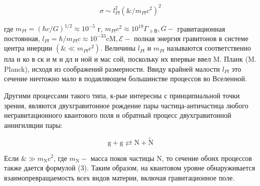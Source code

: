 \documentclass[10pt]{article}
\begin{document}
\[

\sigma \sim l_{P l}^{2}\left(\& / m_{P l} c^{2}\right)^{2}

\]



где $m_{P l}=(\hbar c / G)^{1 / 2} \approx 10^{-5}$ г, $m_{P l} c^{2} \approx 10^{19} \Gamma_{\ni В}, G-$ гравитационная постоянная, $l_{P l}=\hbar / m_{P l} c \approx 10^{-33} \mathrm{cM}, \mathscr{E}-$ полная энергия гравитонов в системе центра инерции $\left(\mathscr{\&} \ll m_{P l} c^{2}\right)$. Величины $l_{P l}$ и $m_{P l}$ называются соответственно пла н ко в ск и м и дл и ной и мас сой, поскольку их впервые ввел M. Планк (M. Planck), исходя из соображений размерности. Ввиду крайней малости $l_{P l}$ это сечение ничтожно мало в подавляющем большинстве процессов во Вселенной.



Другими процессами такого типа, к-рые интересны с принципиальной точки зрения, являются двухгравитонное рождение пары частица-античастица любого негравитационного квантового поля и обратный процесс двухгравитонной аннигиляции пары:



\[

\mathrm{g}+\mathrm{g} \rightleftarrows \mathrm{N}+\tilde{\mathrm{N}}

\]



Если $\& \gg m_{\mathrm{N}} c^{2}$, где $m_{\mathrm{N}}-$ масса покоя частицы $\mathrm{N}$, то сечение обоих процессов также дается формулой (3). Таким образом, на квантовом уровне обнаруживается взаимопревращаемость всех видов материи, включая гравитационное поле.
\end{document}

